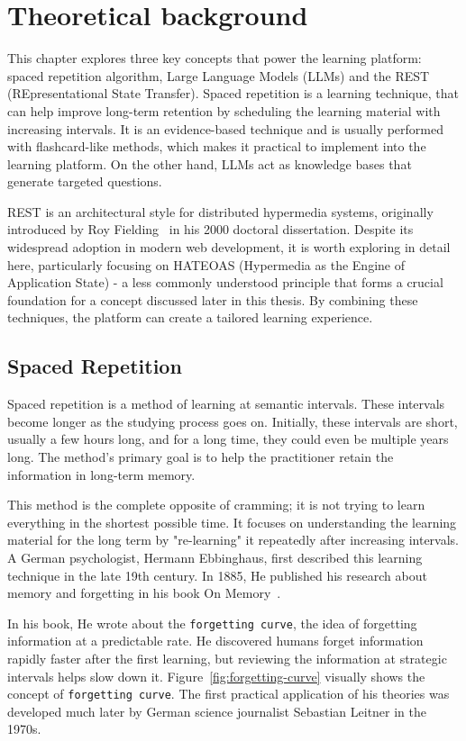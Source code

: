 \chapter{Theoretical background}

This chapter explores three key concepts that power the learning platform: spaced repetition algorithm, Large Language Models (LLMs) and the REST (REpresentational State Transfer). Spaced repetition is a learning technique, that can help improve long-term retention by scheduling the learning material with increasing intervals. It is an evidence-based technique and is usually performed with flashcard-like methods, which makes it practical to implement into the learning platform. On the other hand, LLMs act as knowledge bases that generate targeted questions.

REST is an architectural style for distributed hypermedia systems, originally introduced by Roy Fielding~\cite{fielding2000} in his 2000 doctoral dissertation. Despite its widespread adoption in modern web development, it is worth exploring in detail here, particularly focusing on HATEOAS (Hypermedia as the Engine of Application State) - a less commonly understood principle that forms a crucial foundation for a concept discussed later in this thesis. By combining these techniques, the platform can create a tailored learning experience.

\section{Spaced Repetition}

Spaced repetition is a method of learning at semantic intervals. These intervals become longer as the studying process goes on. Initially, these intervals are short, usually a few hours long, and for a long time, they could even be multiple years long. The method's primary goal is to help the practitioner retain the information in long-term memory.

This method is the complete opposite of cramming; it is not trying to learn everything in the shortest possible time. It focuses on understanding the learning material for the long term by "re-learning" it repeatedly after increasing intervals. A German psychologist, Hermann Ebbinghaus, first described this learning technique in the late 19th century. In 1885, He published his research about memory and forgetting in his book On Memory~\cite{ebbinghaus1964memory}.

In his book, He wrote about the \texttt{forgetting curve}, the idea of forgetting information at a predictable rate. He discovered humans forget information rapidly faster after the first learning, but reviewing the information at strategic intervals helps slow down it. Figure~\ref{fig:forgetting-curve} visually shows the concept of \texttt{forgetting curve}. The first practical application of his theories was developed much later by German science journalist Sebastian Leitner in the 1970s.

